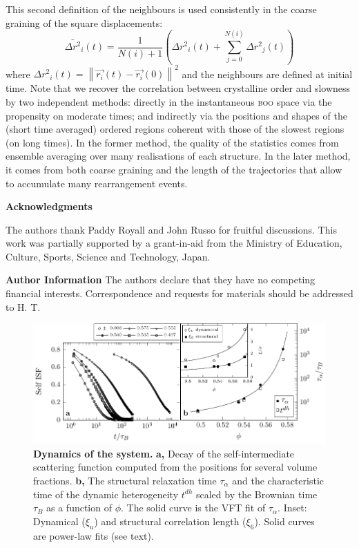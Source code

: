 This second definition of the neighbours is used consistently in the coarse graining of the square displacements:
\begin{equation}
	\bar{\Delta r^2}_i(t) = \frac{1}{N(i)+1}\left( {\Delta r^2}_i(t) + \sum_{j=0}^{N(i)} {\Delta r^2}_j(t) \right) 
	\label{eq:Mu}
\end{equation}
where ${\Delta r^2}_i(t) = \left\|\vec{r_i}(t)-\vec{r_i}(0)\right\|^2$ and the neighbours are defined at initial time. Note that we recover the correlation between crystalline order and slowness by two independent methods: directly in the instantaneous \textsc{boo} space via the propensity on moderate times; and indirectly via the positions and shapes of the (short time averaged) ordered regions coherent with those of the slowest regions (on long times). In the former method, the quality of the statistics comes from ensemble averaging over many realisations of each structure. In the later method, it comes from both coarse graining and the length of the trajectories that allow to accumulate many rearrangement events.

%



\vspace{2cm}
\noindent
\textbf{Acknowledgments}

\noindent
The authors thank Paddy Royall and John Russo for fruitful discussions. 
This work was partially supported by a grant-in-aid from the 
Ministry of Education, Culture, Sports, Science and Technology, Japan. 

\sloppy
\noindent
{\bf Author Information} 
The authors declare that they have no competing financial interests. 
Correspondence and requests for materials should be addressed to 
H. T. 

\clearpage

\begin{figure}
\begin{center}
\includegraphics{generate_figures-figure0.pdf}
\end{center}
\caption{\textbf{Dynamics of the system.} {\bf a,} Decay of the self-intermediate scattering function computed from the positions for several volume fractions. {\bf b,} The structural relaxation time $\tau_\alpha$ and the characteristic time of the dynamic heterogeneity $t^{dh}$ scaled by the Brownian time $\tau_B$ as a function of $\phi$. The solid curve is the VFT fit of $\tau_\alpha$. Inset: Dynamical ($\xi_u$) and structural correlation length ($\xi_6$). Solid curves are power-law fits (see text).}
	\label{fig:vft}
\end{figure}

